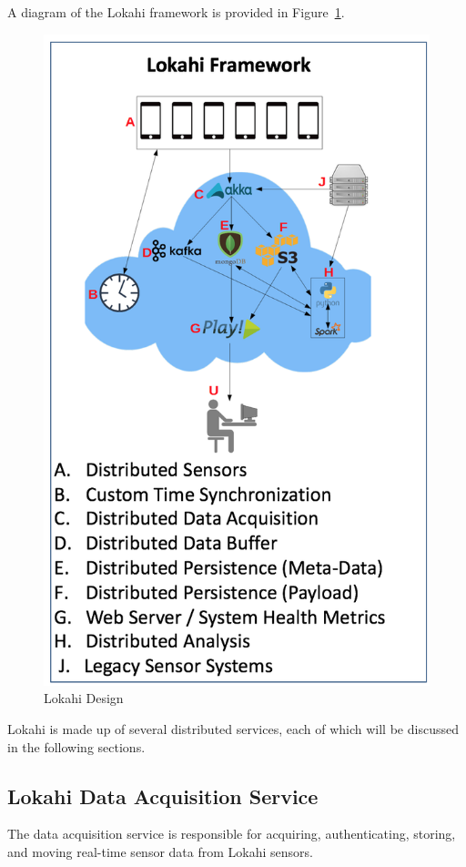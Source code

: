A diagram of the Lokahi framework is provided in Figure~\ref{fig:lokahi}.

\begin{figure}
	\centering
	\includegraphics[]{figures/lokahi.png}
	\caption{Lokahi Design}\label{fig:lokahi}
\end{figure}

Lokahi is made up of several distributed services, each of which will be discussed in the following sections.

\subsection{Lokahi Data Acquisition Service}\label{subsec:lokahi-data-acquisition-service}
The data acquisition service is responsible for acquiring, authenticating, storing, and moving real-time sensor data from Lokahi sensors.

